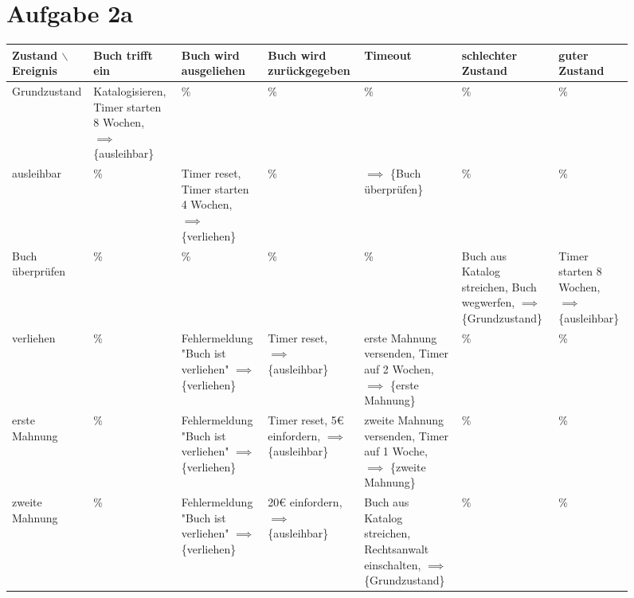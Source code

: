 \documentclass[koma,a4paper,10pt]{scrartcl}
\begin{document}
\begin{sidewaysfigure}
\section{Aufgabe 2a}
\label{sec-2}
\begin{center}
\begin{tabular}{|p{3cm}|p{3cm}|p{3cm}|p{3cm}|p{3cm}|p{3cm}|p{3cm}|}
Zustand $\backslash$ Ereignis & Buch trifft ein & Buch wird ausgeliehen & Buch wird zurückgegeben & Timeout & schlechter Zustand & guter Zustand\\
\hline
Grundzustand & Katalogisieren, Timer starten 8 Wochen, $\implies$ \{ausleihbar\} & \% & \% & \% & \% & \%\\
ausleihbar & \% & Timer reset, Timer starten 4 Wochen, $\implies$ \{verliehen\} & \% & $\implies$ \{Buch überprüfen\} & \% & \%\\
Buch überprüfen & \% & \% & \% & \% & Buch aus Katalog streichen, Buch wegwerfen, $\implies$ \{Grundzustand\} & Timer starten 8 Wochen, $\implies$ \{ausleihbar\}\\
verliehen & \% & Fehlermeldung "Buch ist verliehen" $\implies$ \{verliehen\} & Timer reset, $\implies$ \{ausleihbar\} & erste Mahnung versenden, Timer auf 2 Wochen, $\implies$ \{erste Mahnung\} & \% & \%\\
erste Mahnung & \% & Fehlermeldung "Buch ist verliehen" $\implies$ \{verliehen\} & Timer reset, 5€ einfordern, $\implies$ \{ausleihbar\} & zweite Mahnung versenden, Timer auf 1 Woche, $\implies$ \{zweite Mahnung\} & \% & \%\\
zweite Mahnung & \% & Fehlermeldung "Buch ist verliehen" $\implies$ \{verliehen\} & 20€ einfordern, $\implies$ \{ausleihbar\} & Buch aus Katalog streichen, Rechtsanwalt einschalten, $\implies$ \{Grundzustand\} & \% & \%\\
\end{tabular}
\end{center}
\end{sidewaysfigure}
\end{document}
